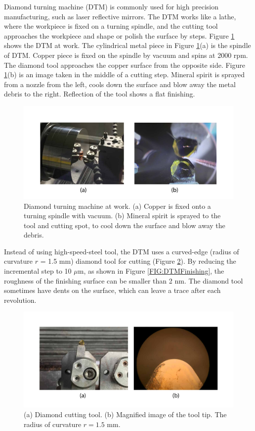 \documentclass[pdflatex, sectionletters, 12pt]{pittetd}    %
\begin{document}
Diamond turning machine (DTM) is commonly used for high precision manufacturing, such as laser reflective mirrors. The DTM works like a lathe, where the workpiece is fixed on a turning spindle, and the cutting tool approaches the workpiece and shape or polish the surface by steps. Figure \ref{FIG:DTM} shows the DTM at work. The cylindrical metal piece in Figure \ref{FIG:DTM}(a) is the spindle of DTM. Copper piece is fixed on the spindle by vacuum and spins at 2000 rpm. The diamond tool approaches the copper surface from the opposite side. Figure \ref{FIG:DTM}(b) is an image taken in the middle of a cutting step. Mineral spirit is sprayed from a nozzle from the left, cools down the surface and blow away the metal debris to the right. Reflection of the tool shows a flat finishing.

\begin{figure}[h!]
	\centering
	\includegraphics[width=1.0\textwidth]{Drawing/DTM.pdf}
	\caption{Diamond turning machine at work. (a) Copper is fixed onto a turning spindle with vacuum. (b) Mineral spirit is sprayed to the tool and cutting spot, to cool down the surface and blow away the debris.}
	\label{FIG:DTM}
\end{figure}

Instead of using high-speed-steel tool, the DTM uses a curved-edge (radius of curvature $r$ = 1.5 mm) diamond tool for cutting (Figure \ref{FIG:DiamondTool}). By reducing the incremental step to 10 $\mu$m, as shown in Figure \ref{FIG:DTMFinishing}, the roughness of the finishing surface can be smaller than 2 nm. The diamond tool sometimes have dents on the surface, which can leave a trace after each revolution.

\begin{figure}[h!]
	\centering
	\includegraphics[width=1.0\textwidth]{Drawing/DiamondTool.pdf}
	\caption{(a) Diamond cutting tool. (b) Magnified image of the tool tip. The radius of curvature $r = 1.5$ mm.}
	\label{FIG:DiamondTool}
\end{figure}
\end{document}
